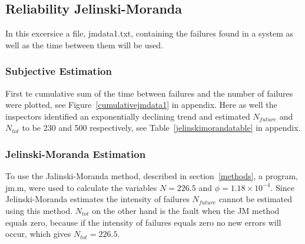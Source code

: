 \subsection{Reliability Jelinski-Moranda}
In this excersice a file, jmdata1.txt, containing the failures found in a system as well as the time between them will be used.

\subsubsection*{Subjective Estimation} 
First te cumulative sum of the time between failures and the number of failures were plotted, see Figure~\ref{cumulativejmdata1} in appendix. Here as well the inspectors identified an exponentially declining trend and estimated $N_{future}$ and $N_{tot}$ to be 230 and 500 respectively, see Table~\ref{jelinskimorandatable} in appendix.

\subsubsection*{Jelinski-Moranda Estimation}
\label{jmestimation}
To use the Jalinski-Moranda method, described in section~\ref{methods}, a program, jm.m, were used to calculate the variables $N=226.5$ and $\phi=1.18\times10^{-4}$. Since Jelinski-Moranda estimates the intensity of failures $N_{future}$ cannot be estimated using this method.
$N_{tot}$ on the other hand is the fault when the JM method equals zero, because if the intensity of failures equals zero no new errors will occur, which gives $N_{tot}=226.5$.

